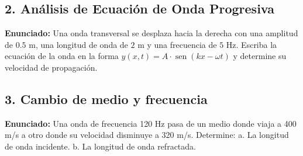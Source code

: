 \documentclass[12pt, letterpaper]{article}
\begin{document}

\subsection*{2. Análisis de Ecuación de Onda Progresiva}
\noindent \textbf{Enunciado:} Una onda transversal se desplaza hacia la derecha con una amplitud de $0.5$ m, una longitud de onda de $2$ m y una frecuencia de $5$ Hz. Escriba la ecuación de la onda en la forma $y(x,t) = A \cdot \operatorname{sen}(kx - \omega t)$ y determine su velocidad de propagación.


\subsection*{3. Cambio de medio y frecuencia}
\noindent \textbf{Enunciado:} Una onda de frecuencia 120 Hz pasa de un medio donde viaja a 400 m/s a otro donde su velocidad disminuye a 320 m/s. Determine: a. La longitud de onda incidente. b. La longitud de onda refractada.
\end{document}
